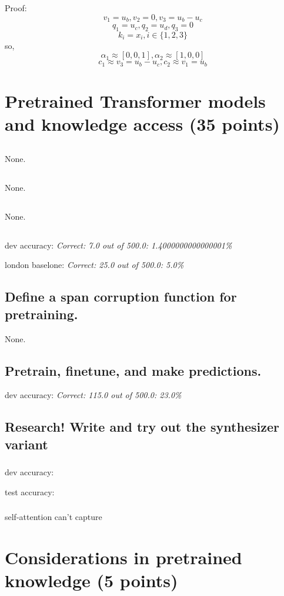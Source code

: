 \documentclass{homework}
\begin{document}
Proof:
$$
v_{1}=u_{b}, v_{2}=0, v_{3}=u_{b}-u_{c}
$$
$$
q_{1}=u_{c}, q_{2}=u_d, q_{3}=0
$$
$$
k_i=x_i, i\in \{1,2,3\}
$$
\quad so,
$$
\alpha_{1} \approx[0,0,1], \alpha_{2} \approx[1,0,0]
$$
$$
c_{1} \approx v_{3}=u_{b}-u_{c}, c_{2} \approx v_{1}=u_{b}
$$



\section{Pretrained Transformer models and knowledge access (35 points)}
\subsection{} None.
\subsection{} None.
\subsection{} None.
\subsection{}
dev accuracy: \textsl{Correct: 7.0 out of 500.0: 1.4000000000000001\%}

london baselone: \textsl{Correct: 25.0 out of 500.0: 5.0\%}

\subsection{Define a span corruption function for pretraining.}
None.

\subsection{Pretrain, finetune, and make predictions.}
dev accuracy: \textsl{Correct: 115.0 out of 500.0: 23.0\%}

\subsection{Research! Write and try out the synthesizer variant}
\subsubsection{}
dev accuracy:

test accuracy: 

\subsubsection{}
 self-attention can't capture 

\section{Considerations in pretrained knowledge (5 points)}
\end{document}
